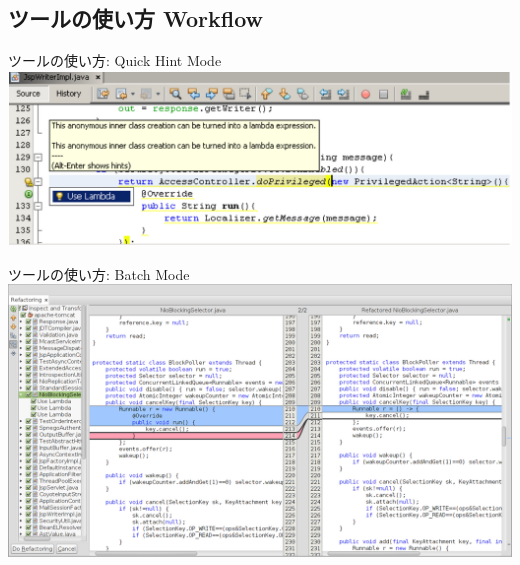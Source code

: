 \subsection{ツールの使い方 Workflow}
\begin{frame}{ツールの使い方: Quick Hint Mode}
\includegraphics[width=\textwidth]{quickhint}
\end{frame}
\begin{frame}{ツールの使い方: Batch Mode}
\includegraphics[width=\textwidth, height=0.9\textheight, keepaspectratio]{batch}
\end{frame}
